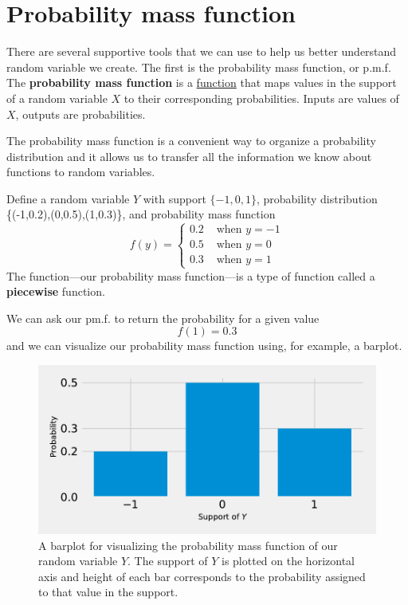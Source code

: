 \section{Probability mass function}

There are several supportive tools that we can use to help us better understand random variable we create.
The first is the probability mass function, or p.m.f.
The \textbf{probability mass function} is a \underline{function} that maps values in the support of a random variable $X$ to their corresponding probabilities.
Inputs are values of $X$, outputs are probabilities.

The probability mass function is a convenient way to organize a probability distribution and it allows us to transfer all the information we know about functions to random variables.

\ex Define a random variable $Y$ with support $\{-1,0,1\}$, probability distribution \{(-1,0.2),(0,0.5),(1,0.3)\}, and probability mass function 
\begin{equation}
    f(y) = \begin{cases}
            0.2 & \text{ when } y=-1\\
            0.5 & \text{ when } y = 0\\
            0.3 & \text{ when } y=1
            \end{cases}
\end{equation}
The function---our probability mass function---is a type of function called a \textbf{piecewise} function.

We can ask our pm.f. to return the probability for a given value
\begin{equation}
    f(1) = 0.3
\end{equation}
and we can visualize our probability mass function using, for example, a barplot.
\begin{figure}[ht!]
    \centering
    \includegraphics{chapters/chapter2/pmfviz.pdf}
    \caption{A barplot for visualizing the probability mass function of our random variable $Y$. The support of $Y$ is plotted on the horizontal axis and height of each bar corresponds to the probability assigned to that value in the support.\label{fig.pmfviz}}
\end{figure}

